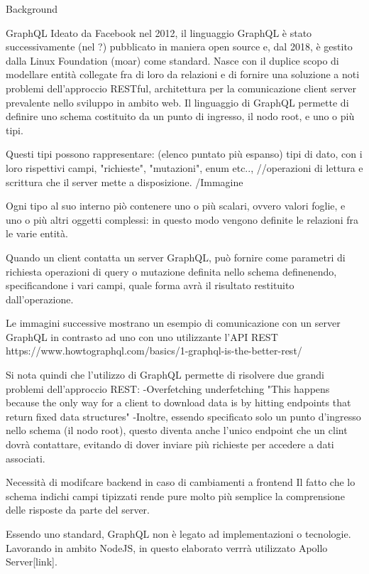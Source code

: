 Background

    GraphQL
        Ideato da Facebook nel 2012, il linguaggio GraphQL è stato successivamente (nel ?) pubblicato in maniera open source e, dal 2018, è gestito dalla Linux Foundation (moar) come standard.
        Nasce con il duplice scopo di modellare entità collegate fra di loro da relazioni e di fornire una soluzione a noti problemi dell'approccio RESTful, architettura per la comunicazione client server prevalente nello sviluppo in ambito web.
        Il linguaggio di GraphQL permette di definire uno schema costituito da un punto di ingresso, il nodo root, e uno o più tipi.
        
        Questi tipi possono rappresentare: (elenco puntato più espanso) tipi di dato, con i loro rispettivi campi, "richieste", "mutazioni", enum etc..,  //operazioni di lettura e scrittura che il server mette a disposizione.
            /Immagine
        
        Ogni tipo al suo interno piò contenere uno o più scalari, ovvero valori foglie, e uno o più altri oggetti complessi: in questo modo vengono definite le relazioni fra le varie entità.

        Quando un client contatta un server GraphQL, può fornire come parametri di richiesta operazioni di query o mutazione definita nello schema definenendo, specificandone i vari campi, quale forma avrà il risultato restituito dall'operazione.

        Le immagini successive mostrano un esempio di comunicazione con un server GraphQL in contrasto ad uno con uno utilizzante l'API REST
        https://www.howtographql.com/basics/1-graphql-is-the-better-rest/


        Si nota quindi che l'utilizzo di GraphQL permette di risolvere due grandi problemi dell'approccio REST:
            -Overfetching underfetching "This happens because the only way for a client to download data is by hitting endpoints that return fixed data structures"
            -Inoltre, essendo specificato solo un punto d'ingresso nello schema (il nodo root), questo diventa anche l'unico endpoint che un clint dovrà contattare, evitando di dover inviare più richieste per accedere a dati associati. 
        
        Necessità di modifcare backend in caso di cambiamenti a frontend
        Il fatto che lo schema indichi campi tipizzati rende pure molto più semplice la comprensione delle risposte da parte del server.

        Essendo uno standard, GraphQL non è legato ad implementazioni o tecnologie. Lavorando in ambito NodeJS, in questo elaborato verrrà utilizzato Apollo Server[link].

